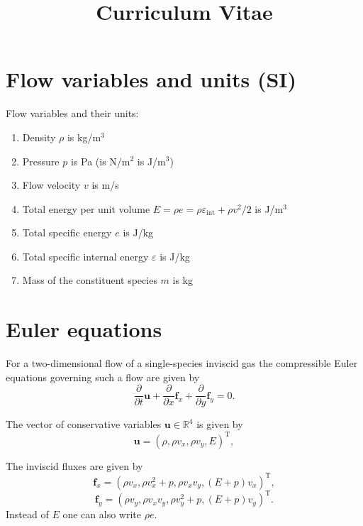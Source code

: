 \documentclass[a4paper,11pt,english]{article}
\title{Curriculum Vitae}
\begin{document}
\section{Flow variables and units (SI)}

Flow variables and their units:
\begin{enumerate}
    \item Density $\rho$ is kg/m$^3$
    \item Pressure $p$ is Pa (is N/m$^2$ is J/m$^3$)
    \item Flow velocity $v$ is m/s
    \item Total energy per unit volume $E=\rho e=\rho \varepsilon_{\mathrm{int}} + \rho v^2 / 2$ is J/m$^3$
    \item Total specific energy $e$ is J/kg
    \item Total specific internal energy $\varepsilon$ is J/kg
    \item Mass of the constituent species $m$ is kg
\end{enumerate}

\section{Euler equations}
For a two-dimensional flow of a single-species inviscid gas the compressible Euler equations governing such a flow are given by
\begin{equation}
    \frac{\partial}{\partial t}\mathbf{u} + \frac{\partial}{\partial x}\mathbf{f}_x + \frac{\partial}{\partial y}\mathbf{f}_y = 0.
\end{equation}

The vector of conservative variables  $\mathbf{u} \in \mathbb{R}^4$ is given by
\begin{equation}
     \mathbf{u} = \left(\rho, \rho v_x, \rho v_y, E \right)^{\mathrm{T}},
\end{equation}

The inviscid fluxes are given by
\begin{equation}
     \mathbf{f}_x = \left(\rho v_x, \rho v_x^2 + p, \rho v_x v_y, (E+p)v_x \right)^{\mathrm{T}},
\end{equation}
\begin{equation}
     \mathbf{f}_y = \left(\rho v_y, \rho v_x v_y, \rho v_y^2 + p, (E+p)v_y \right)^{\mathrm{T}}.
\end{equation}
Instead of $E$ one can also write $\rho e$.
\end{document}
